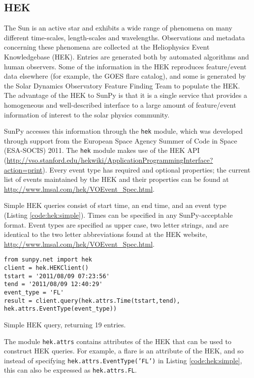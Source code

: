\subsection{HEK}\label{ssec:hek}

The Sun is an active star and exhibits a wide range of phenomena on many 
different time-scales, length-scales and wavelengths. Observations and metadata 
concerning these phenomena are collected at the Heliophysics Event 
Knowledgebase (HEK).  Entries are generated both by automated algorithms and 
human observers.  Some of the information in the HEK reproduces feature/event 
data elsewhere (for example, the GOES flare catalog), and some is generated by 
the Solar Dynamics Observatory Feature Finding Team \cite{SDOFFT paper???} to
populate the HEK.  The advantage of the HEK to SunPy is that it is a single 
service that provides a homogeneous and well-described interface to a large 
amount of feature/event information of interest to the solar physics community.

SunPy accesses this information through the \texttt{hek} module, which was 
developed through support from the European Space Agency Summer of Code in 
Space (ESA-SOCIS) 2011.  The \texttt{hek} module makes use of the HEK API
(\url{http://vso.stanford.edu/hekwiki/ApplicationProgrammingInterface?action=print}).
Every event type has required and optional properties; the current list of 
events maintained by the HEK and their properties can be found at 
\url{http://www.lmsal.com/hek/VOEvent_Spec.html}.

Simple HEK queries consist of start time, an end time, and an event type 
(Listing \ref{code:hek:simple}). Times can be specified in any SunPy-acceptable 
format. Event types are specified as upper case, two letter strings, and are 
identical to the two letter abbreviations found at the HEK website, 
\url{http://www.lmsal.com/hek/VOEvent_Spec.html}.

\begin{listing}[H]
\begin{verbatim}
from sunpy.net import hek
client = hek.HEKClient()
tstart = '2011/08/09 07:23:56'
tend = '2011/08/09 12:40:29'
event_type = 'FL'
result = client.query(hek.attrs.Time(tstart,tend), 
hek.attrs.EventType(event_type))
\end{verbatim}
\caption{Simple HEK query, returning 19 entries.}
\label{code:hek:simple}
\end{listing}

The module \texttt{hek.attrs} contains attributes of the HEK that can be used to
construct HEK queries.  For example, a flare is an attribute of the HEK, and so 
instead of specifying \texttt{hek.attrs.EventType('FL')} in Listing 
\ref{code:hek:simple}, this can also be expressed as \texttt{hek.attrs.FL}. 

